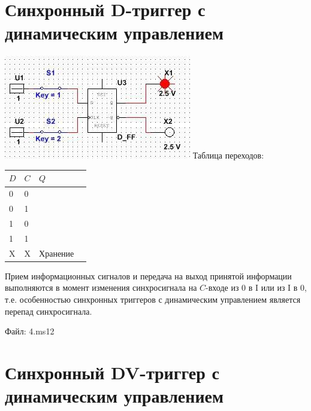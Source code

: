 \documentclass[a4paper,12pt]{article}
\begin{document}
\section{Синхронный D-триггер с динамическим управлением}

\begin{center}
	\includegraphics[scale=1.3]{../screens/4.jpg} \newline\newline
	Таблица переходов: 
	
	\begin{center}
		\begin{tabular}{ | l | l | l | p{1cm} |}
			\hline
			$D$ & $C$ & $Q$ \\ \hline
			0 & 0 & {\multirow{2}{*}{0}} \\
			0 & 1 & \\ \hline
			
			1 & 0 & {\multirow{2}{*}{1}} \\
			1 & 1 & \\ \hline
			
			X & X & Хранение \\ 
			\hline
		\end{tabular}
	\end{center}
\end{center}

\noindent Прием информационных сигналов и передача на выход принятой информации выполняются в момент изменения синхросигнала на $C$-входе из 0 в I или из I в 0, т.е. особенностью синхронных триггеров с динамическим управлением является перепад синхросигнала. \newline

\noindent Файл: 4.ms12

\clearpage
\section{Синхронный DV-триггер с динамическим управлением}
\end{document}
